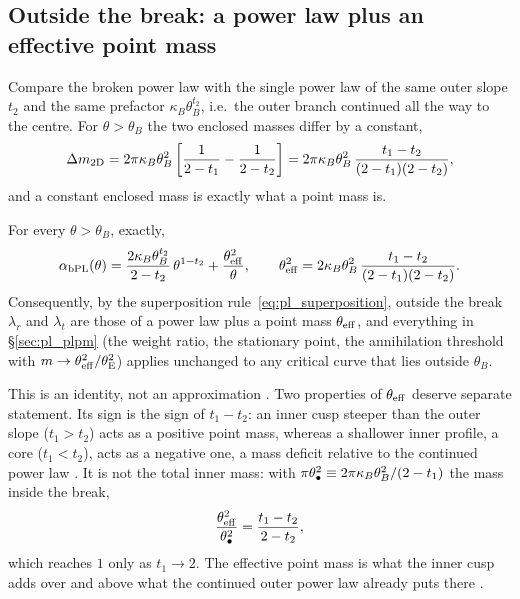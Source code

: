 \subsection{Outside the break: a power law plus an effective point mass}
\label{sec:bpl_identity}

Compare the broken power law with the single power law of the same
outer slope $t_2$ and the same prefactor $\kappa_B\theta_B^{t_2}$, i.e.\
the outer branch continued all the way to the centre.  For
$\theta>\theta_B$ the two enclosed masses differ by a constant,
\[
  \Delta m_{2\rm D}=2\pi\kappa_B\theta_B^2\left[\frac{1}{2-t_1}-\frac{1}{2-t_2}\right]
                   =2\pi\kappa_B\theta_B^2\,\frac{t_1-t_2}{(2-t_1)(2-t_2)} ,
\]
and a constant enclosed mass is exactly what a point mass is.

\begin{keybox}[Outside the break, broken power law $=$ power law $+$ point mass]
For every $\theta>\theta_B$, exactly,
\begin{equation}
    \alpha_{\rm bPL}(\theta)=\frac{2\kappa_B\theta_B^{t_2}}{2-t_2}\,\theta^{1-t_2}
      +\frac{\theta_{\rm eff}^2}{\theta} ,
    \qquad
    \theta_{\rm eff}^{2}=2\kappa_B\theta_B^{2}\,\frac{t_1-t_2}{(2-t_1)(2-t_2)} .
    \label{eq:bpl_identity}
\end{equation}
Consequently, by the superposition rule~\eqref{eq:pl_superposition},
outside the break $\lambda_r$ and $\lambda_t$ are those of a power law
plus a point mass $\theta_{\rm eff}$, and everything in
\S\ref{sec:pl_plpm} (the weight ratio, the stationary point, the
annihilation threshold with $m\to\theta_{\rm eff}^2/\theta_{\mathrm{E}}^2$)
applies unchanged to any critical curve that lies outside $\theta_B$.
\end{keybox}

This is an identity, not an approximation .
Two properties of $\theta_{\rm eff}$ deserve separate statement.
Its sign is the sign of $t_1-t_2$: an inner cusp
steeper than the outer slope ($t_1>t_2$) acts as a positive
point mass, whereas a shallower inner profile, a core ($t_1<t_2$),
acts as a negative one, a mass deficit relative to the
continued power law .
It is not the total inner mass: with
$\pi\theta_{\bullet}^2\equiv2\pi\kappa_B\theta_B^2/(2-t_1)$ the mass
inside the break,
\begin{equation}
    \frac{\theta_{\rm eff}^2}{\theta_{\bullet}^2}=\frac{t_1-t_2}{2-t_2} ,
    \label{eq:bpl_eff_ratio}
\end{equation}
which reaches $1$ only as $t_1\to2$.  The effective point mass
is what the inner cusp adds over and above what the
continued outer power law already puts there .

